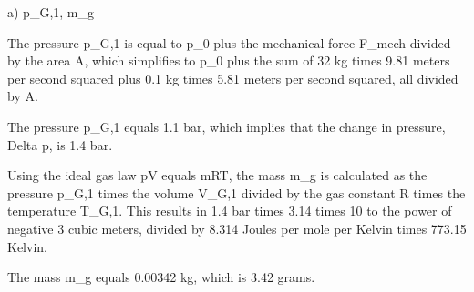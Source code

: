 a) p_G,1, m_g

The pressure p_G,1 is equal to p_0 plus the mechanical force F_mech divided by the area A, which simplifies to p_0 plus the sum of 32 kg times 9.81 meters per second squared plus 0.1 kg times 5.81 meters per second squared, all divided by A.

The pressure p_G,1 equals 1.1 bar, which implies that the change in pressure, Delta p, is 1.4 bar.

Using the ideal gas law pV equals mRT, the mass m_g is calculated as the pressure p_G,1 times the volume V_G,1 divided by the gas constant R times the temperature T_G,1. This results in 1.4 bar times 3.14 times 10 to the power of negative 3 cubic meters, divided by 8.314 Joules per mole per Kelvin times 773.15 Kelvin.

The mass m_g equals 0.00342 kg, which is 3.42 grams.